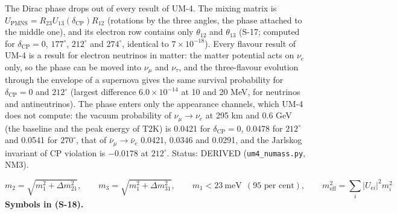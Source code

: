 \documentclass[
  10pt,
]{article}
\begin{document}
The Dirac phase drops out of every result of UM-4. The mixing matrix is
\(U_{\mathrm{PMNS}} = R_{23}U_{13}(\delta_{\mathrm{CP}})R_{12}\)
(rotations by the three angles, the phase attached to the middle one),
and its electron row contains only \(\theta_{12}\) and \(\theta_{13}\)
(S-17; computed for \(\delta_{\mathrm{CP}} = 0\), \(177^\circ\),
\(212^\circ\) and \(274^\circ\), identical to \(7\times10^{-18}\)).
Every flavour result of UM-4 is a result for electron neutrinos in
matter: the matter potential acts on \(\nu_e\) only, so the phase can be
moved into \(\nu_\mu\) and \(\nu_\tau\), and the three-flavour evolution
through the envelope of a supernova gives the same survival probability
for \(\delta_{\mathrm{CP}} = 0\) and \(212^\circ\) (largest difference
\(6.0\times10^{-14}\) at 10 and 20 MeV, for neutrinos and
antineutrinos). The phase enters only the appearance channels, which
UM-4 does not compute: the vacuum probability of \(\nu_\mu \to \nu_e\)
at 295 km and 0.6 GeV (the baseline and the peak energy of T2K) is
0.0421 for \(\delta_{\mathrm{CP}} = 0\), 0.0478 for \(212^\circ\) and
0.0541 for \(270^\circ\), that of \(\bar\nu_\mu \to \bar\nu_e\) 0.0421,
0.0346 and 0.0291, and the Jarlskog invariant of CP violation is
\(-0.0178\) at \(212^\circ\). Status: DERIVED (\texttt{um4\_numass.py},
NM3).

\[
m_2 = \sqrt{m_1^2 + \Delta m^2_{21}},\qquad m_3 = \sqrt{m_1^2 + \Delta m^2_{31}},\qquad
m_1 < 23\ \text{meV}\ \ (\text{95 per cent}),\qquad
m_{\mathrm{eff}}^2 = \sum_i\lvert U_{\mathrm{e}i}\rvert^2m_i^2 \tag{S-18}
\] \textbf{Symbols in (S-18).}
\end{document}
